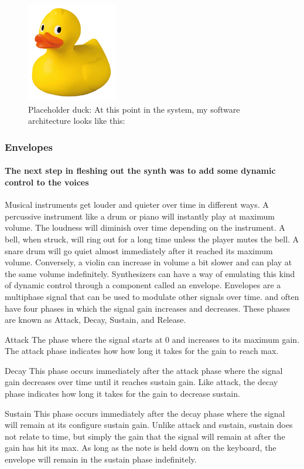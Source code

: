 \documentclass[acmlarge,screen]{acmart}
\begin{document}
	\begin{figure}[H]
		\includegraphics[width=4cm]{placeholder_duck}
		\caption{Placeholder duck: At this point in the system, my software architecture looks like this:}
		\centering
	\end{figure}

	
	\subsubsection{Envelopes}
	\paragraph{The next step in fleshing out the synth was to add some dynamic control to the voices} Musical instruments get louder and quieter over time in different ways. A percussive instrument like a drum or piano will instantly play at maximum volume. The loudness will diminish over time depending on the instrument. A bell, when struck, will ring out for a long time unless the player mutes the bell. A snare drum will go quiet almost immediately after it reached its maximum volume. Conversely, a violin can increase in volume a bit slower and can play at the same volume indefinitely. Synthesizers can have a way of emulating this kind of dynamic control through a component called an envelope. Envelopes are a multiphase signal that can be used to modulate other signals over time. and often have four phases in which the signal gain increases and decreases. These phases are known as Attack, Decay, Sustain, and Release.
	
	Attack
	The phase where the signal starts at 0 and increases to its maximum gain. The attack phase indicates how how long it takes for the gain to reach max.
	
	Decay
	This phase occurs immediately after the attack phase where the signal gain decreases over time until it reaches sustain gain. Like attack, the decay phase indicates how long it takes for the gain to decrease sustain.
	
	Sustain
	This phase occurs immediately after the decay phase where the signal will remain at its configure sustain gain. Unlike attack and sustain, sustain does not relate to time, but simply the gain that the signal will remain at after the gain has hit its max. As long as the note is held down on the keyboard, the envelope will remain in the sustain phase indefinitely.
	
\end{document}
